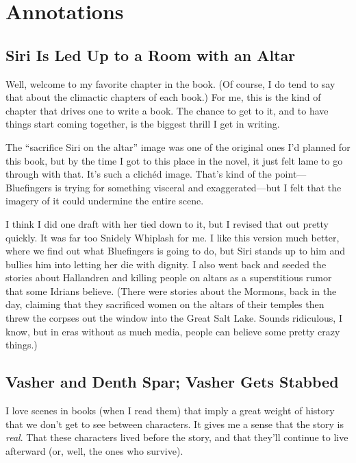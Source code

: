 \section*{Annotations}

\subsection*{Siri Is Led Up to a Room with an Altar}

Well, welcome to my favorite chapter in the book. (Of course, I do tend to say that about the climactic chapters of each book.) For me, this is the kind of chapter that drives one to write a book. The chance to get to it, and to have things start coming together, is the biggest thrill I get in writing.

The “sacrifice Siri on the altar” image was one of the original ones I’d planned for this book, but by the time I got to this place in the novel, it just felt lame to go through with that. It’s such a clichéd image. That’s kind of the point—Bluefingers is trying for something visceral and exaggerated—but I felt that the imagery of it could undermine the entire scene.

I think I did one draft with her tied down to it, but I revised that out pretty quickly. It was far too Snidely Whiplash for me. I like this version much better, where we find out what Bluefingers is going to do, but Siri stands up to him and bullies him into letting her die with dignity. I also went back and seeded the stories about Hallandren and killing people on altars as a superstitious rumor that some Idrians believe. (There were stories about the Mormons, back in the day, claiming that they sacrificed women on the altars of their temples then threw the corpses out the window into the Great Salt Lake. Sounds ridiculous, I know, but in eras without as much media, people can believe some pretty crazy things.)

\subsection*{Vasher and Denth Spar; Vasher Gets Stabbed}

I love scenes in books (when I read them) that imply a great weight of history that we don’t get to see between characters. It gives me a sense that the story is \textit{real}. That these characters lived before the story, and that they’ll continue to live afterward (or, well, the ones who survive).

